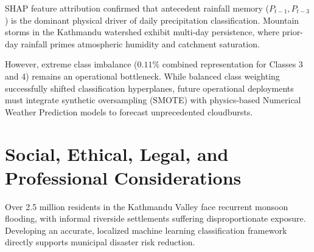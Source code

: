 \documentclass[conference]{IEEEtran}
\begin{document}
SHAP feature attribution confirmed that antecedent rainfall memory ($P_{t-1}, P_{t-3}$) is the dominant physical driver of daily precipitation classification. Mountain storms in the Kathmandu watershed exhibit multi-day persistence, where prior-day rainfall primes atmospheric humidity and catchment saturation.

However, extreme class imbalance ($0.11\%$ combined representation for Classes 3 and 4) remains an operational bottleneck. While balanced class weighting successfully shifted classification hyperplanes, future operational deployments must integrate synthetic oversampling (SMOTE) with physics-based Numerical Weather Prediction models to forecast unprecedented cloudbursts.


\FloatBarrier
\setcounter{section}{8}
\section{Social, Ethical, Legal, and Professional Considerations}
\label{sec:social_ethical}
Over 2.5 million residents in the Kathmandu Valley face recurrent monsoon flooding, with informal riverside settlements suffering disproportionate exposure. Developing an accurate, localized machine learning classification framework directly supports municipal disaster risk reduction.
\end{document}

